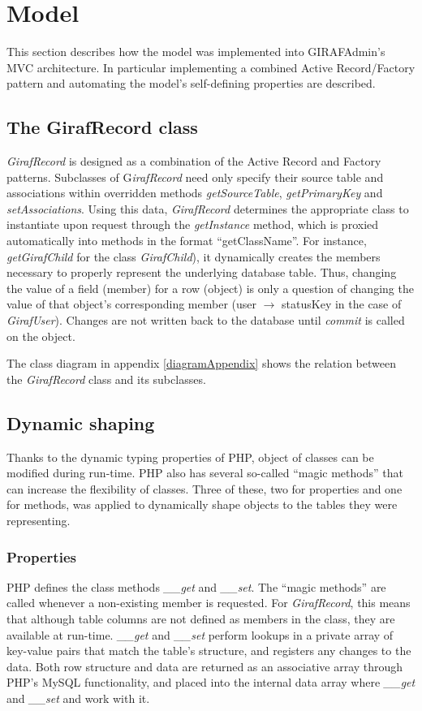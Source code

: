 \section{Model}
\label{model}
This section describes how the model was implemented into GIRAFAdmin's MVC architecture. In particular implementing a combined Active Record/Factory pattern and automating the model's self-defining properties are described.

\subsection{The GirafRecord class}
\emph{GirafRecord} is designed as a combination of the Active Record and Factory patterns. Subclasses of G\emph{irafRecord} need only specify their source table and associations within overridden methods \emph{getSourceTable}, \emph{getPrimaryKey} and \emph{setAssociations}. Using this data, \emph{GirafRecord} determines the appropriate class to instantiate upon request through the \emph{getInstance} method, which is proxied automatically into methods in the format ``getClassName''. For instance, \emph{getGirafChild} for the class \emph{GirafChild}), it dynamically creates the members necessary to properly represent the underlying database table. Thus, changing the value of a field (member) for a row (object) is only a question of changing the value of that object's corresponding member (user $\rightarrow$ statusKey in the case of \emph{GirafUser}). Changes are not written back to the database until \emph{commit} is called on the object.

The class diagram in appendix \ref{diagramAppendix} shows the relation between the \emph{GirafRecord} class and its subclasses.

\subsection{Dynamic shaping}
Thanks to the dynamic typing properties of PHP, object of classes can be modified during run-time. PHP also has several so-called ``magic methods'' that can increase the flexibility of classes\cite{MagicMethods}. Three of these, two for properties and one for methods, was applied to dynamically shape objects to the tables they were representing.

\subsubsection*{Properties}
PHP defines the class methods \emph{\_\_get} and \emph{\_\_set}. The ``magic methods'' are called whenever a non-existing member is requested. For \emph{GirafRecord}, this means that although table columns are not defined as members in the class, they are available at run-time. \emph{\_\_get} and \emph{\_\_set} perform lookups in a private array of key-value pairs that match the table's structure, and registers any changes to the data.
Both row structure and data are returned as an associative array through PHP's MySQL functionality, and placed into the internal data array where \emph{\_\_get} and \emph{\_\_set} and work with it.

